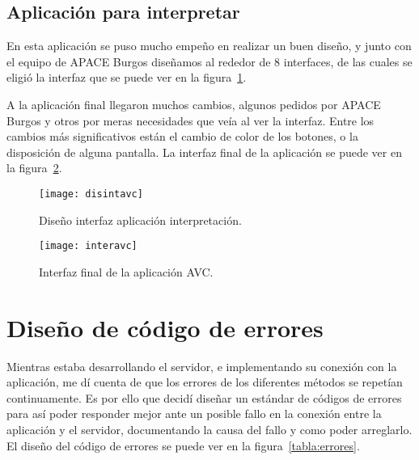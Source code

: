 \subsection{Aplicación para interpretar}
En esta aplicación se puso mucho empeño en realizar un buen diseño, y junto con el equipo de APACE Burgos diseñamos al rededor de 8 interfaces, de las cuales se eligió la interfaz que se puede ver en la figura~\ref{fig:diinter}.

A la aplicación final llegaron muchos cambios, algunos pedidos por APACE Burgos y otros por meras necesidades que veía al ver la interfaz. Entre los cambios más significativos están el cambio de color de los botones, o la disposición de alguna pantalla. La interfaz final de la aplicación se puede ver en la figura~\ref{fig:intfin}.

\begin{figure}[htp]
	\centering
	\texttt{[image: disintavc]}
	\caption{Diseño interfaz aplicación interpretación.}
	\label{fig:diinter}
\end{figure}

\begin{figure}[H]
	\centering
	\texttt{[image: interavc]}
	\caption{Interfaz final de la aplicación AVC.}
	\label{fig:intfin}
\end{figure}

\section{Diseño de código de errores}
Mientras estaba desarrollando el servidor, e implementando su conexión con la aplicación, me dí cuenta de que los errores de los diferentes métodos se repetían continuamente. Es por ello que decidí diseñar un estándar de códigos de errores para así poder responder mejor ante un posible fallo en la conexión entre la aplicación y el servidor, documentando la causa del fallo y como poder arreglarlo. El diseño del código de errores se puede ver en la figura~\ref{tabla:errores}.

